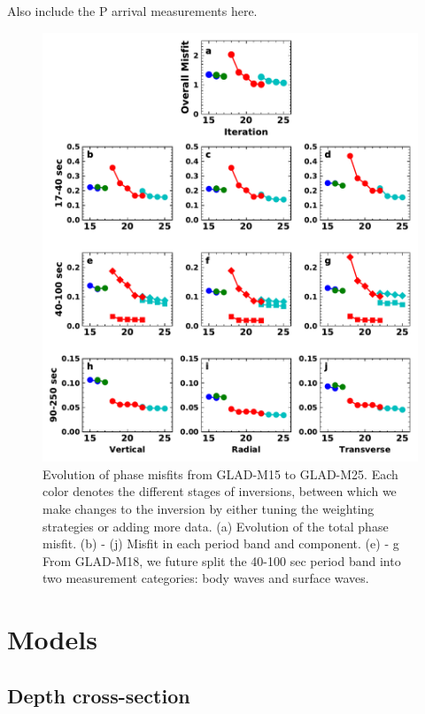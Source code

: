 \documentclass[extra,mreferee]{gji}
\begin{document}
Also include the P arrival measurements here.

\begin{figure}
  \centering
  \includegraphics[width=\textwidth]{figures/misfit.pdf}
  \caption{Evolution of phase misfits from GLAD-M15 to GLAD-M25. Each color denotes the different stages of inversions, between which we make changes to the inversion by either tuning the weighting strategies or adding more data. (a) Evolution of the total phase misfit. (b) - (j) Misfit in each period band and component. (e) - {g} From GLAD-M18, we future split the 40-100 sec period band into two measurement categories: body waves and surface waves.}
\end{figure}


\section{Models}

\subsection{Depth cross-section}
\end{document}

